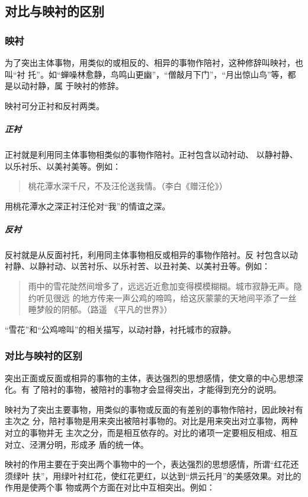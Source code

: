 \documentclass[final,oneside]{ctexbook}
\newenvironment{equotation}{\begin{quotation}\kaishu}{\end{quotation}}
\begin{document}
\subsection{对比与映衬的区别}

\subsubsection{映衬}

为了突出主体事物，用类似的或相反的、相异的事物作陪衬，这种修辞叫映衬，也叫“衬
托”。如“蝉噪林愈静，鸟鸣山更幽”，“僧敲月下门”，“月出惊山鸟”等，都是以动衬静，属
于映衬的修辞。

映衬可分正衬和反衬两类。

\subparagraph{正衬}正衬就是利用同主体事物相类似的事物作陪衬。正衬包含以动衬动、
以静衬静、以乐衬乐、以美衬美等。例如：
\begin{equotation}
  桃花潭水深千尺，不及汪伦送我情。（李白《赠汪伦》）
\end{equotation}
用桃花潭水之深正衬汪伦对“我”的情谊之深。

\subparagraph{反衬}反衬就是从反面衬托，利用同主体事物相反或相异的事物作陪衬。反
衬包含以动衬静、以静衬动、以苦衬乐、以乐衬苦、以丑衬美、以美衬丑等。例如：
\begin{equotation}
  雨中的雪花陡然间增多了，远远近近愈加变得模模糊糊。城市寂静无声。隐约听见很远
  的地方传来一声公鸡的啼鸣，给这灰蒙蒙的天地间平添了一丝睡梦般的阴郁。（路遥
  《平凡的世界》）
\end{equotation}
“雪花”和“公鸡啼叫”的相关描写，以动衬静，衬托城市的寂静。

\subsubsection{对比与映衬的区别}

突出正面或反面或相异的事物的主体，表达强烈的思想感情，使文章的中心思想深化。有
了陪衬的事物，被陪衬的事物才会显得突出，才能得到充分的说明。

映衬为了突出主要事物，用类似的事物或反面的有差别的事物作陪衬，因此映衬有主次之
分，陪衬事物是用来突出被陪衬事物的。对比是用来突出对立事物，两种对立的事物并无
主次之分，而是相互依存的。对比的诸项一定要相反相成、相互对立、泾渭分明，形成矛
盾的统一体。

映衬的作用主要在于突出两个事物中的一个，表达强烈的思想感情，所谓“红花还须绿叶
扶”，用绿叶衬红花，使红花更红，以达到“烘云托月”的美感效果。对比的作用是使两个事
物或两个方面在对比中互相突出。例如：
\end{document}
